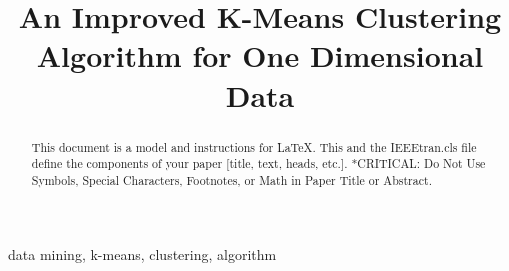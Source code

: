 \documentclass[conference]{IEEEtran}
\begin{document}
\title{An Improved K-Means Clustering Algorithm for One Dimensional Data}

\author{
\and
{}
\and
{}
}

\maketitle

\begin{abstract}
This document is a model and instructions for \LaTeX.
This and the IEEEtran.cls file define the components of your paper [title, text, heads, etc.]. *CRITICAL: Do Not Use Symbols, Special Characters, Footnotes, 
or Math in Paper Title or Abstract.
\end{abstract}

\begin{IEEEkeywords}
data mining, k-means, clustering, algorithm
\end{IEEEkeywords}
\end{document}
